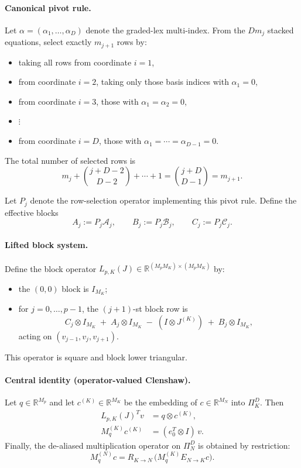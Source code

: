 \documentclass[11pt]{article}
\begin{document}
\paragraph{Canonical pivot rule.}
Let $\alpha=(\alpha_1,\dots,\alpha_D)$ denote the graded-lex multi-index.
From the $D m_j$ stacked equations, select exactly $m_{j+1}$ rows by:
\begin{itemize}
	\item taking all rows from coordinate $i=1$,
	\item from coordinate $i=2$, taking only those basis indices with $\alpha_1=0$,
	\item from coordinate $i=3$, those with $\alpha_1=\alpha_2=0$,
	\item $\vdots$
	\item from coordinate $i=D$, those with $\alpha_1=\cdots=\alpha_{D-1}=0$.
\end{itemize}
The total number of selected rows is
\[
m_j + \binom{j+D-2}{D-2} + \cdots + 1
=
\binom{j+D}{D-1}
=
m_{j+1}.
\]

Let $P_j$ denote the row-selection operator implementing this pivot rule.
Define the effective blocks
\[
A_j := P_j \mathcal A_j,
\qquad
B_j := P_j \mathcal B_j,
\qquad
C_j := P_j \mathcal C_j .
\]

\paragraph{Lifted block system.}
Define the block operator $L_{p,K}(J)\in\mathbb{R}^{(M_p M_K)\times(M_p M_K)}$ by:
\begin{itemize}
	\item the $(0,0)$ block is $I_{M_K}$;
	\item for $j=0,\dots,p-1$, the $(j+1)$-st block row is
	\[
	C_j \otimes I_{M_K}
	\;+\;
	A_j \otimes I_{M_K}
	\;-\;
	(I \otimes J^{(K)})
	\;+\;
	B_j \otimes I_{M_K},
	\]
	acting on $(v_{j-1},v_j,v_{j+1})$.
\end{itemize}
This operator is square and block lower triangular.

\paragraph{Central identity (operator-valued Clenshaw).}
Let $q\in\mathbb{R}^{M_p}$ and let $c^{(K)}\in\mathbb{R}^{M_K}$ be the embedding of
$c\in\mathbb{R}^{M_N}$ into $\Pi_K^D$.
Then
\[
\boxed{
	\begin{aligned}
		L_{p,K}(J)^T v &= q \otimes c^{(K)},\\
		M_q^{(K)} c^{(K)} &= (e_0^T \otimes I)\, v .
\end{aligned}}
\]
Finally, the de-aliased multiplication operator on $\Pi_N^D$ is obtained by restriction:
\[
\boxed{
	M_q^{(N)} c
	=
	R_{K\to N}\,
	\bigl(M_q^{(K)} E_{N\to K} c\bigr).
}
\]
\end{document}
